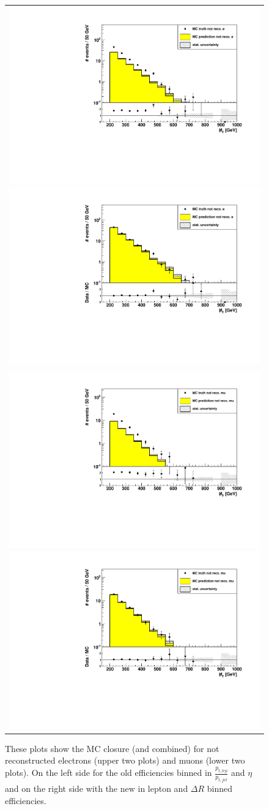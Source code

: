 \begin{figure}[tbhn]
\begin{center}
\begin{tabular}{c}
\includegraphics[width=.55\textwidth]{lostlepton/plots/MHTOldRecoE.pdf}
\includegraphics[width=.55\textwidth]{lostlepton/plots/MHTNewRecoE.pdf}\\
\includegraphics[width=.55\textwidth]{lostlepton/plots/MHTOldRecoMu.pdf}
\includegraphics[width=.55\textwidth]{lostlepton/plots/MHTNewRecoMu.pdf}\\
\end{tabular}
\end{center}
\caption{These plots show the MC closure (\ttbar and \wpj combined) for not reconstructed electrons (upper two plots) and muons (lower two plots). On the left side for the old efficiencies binned in $\frac{p_{t,lep}}{p_{t,jet}}$ and $\eta$ and on the right side with the new in lepton \pt and $\Delta R$ binned efficiencies.}
\label{fig:oldReco}
\end{figure}



